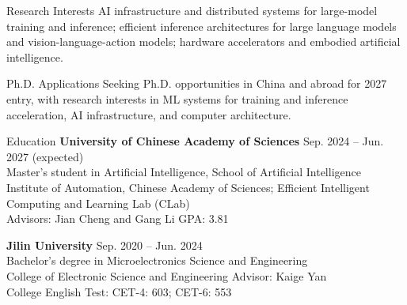 \documentclass{resume}
\begin{document}
\fontsize{10}{12}\selectfont
\begin{rSection}{Research Interests}
AI infrastructure and distributed systems for large-model training and inference; efficient inference architectures for large language models and vision-language-action models; hardware accelerators and embodied artificial intelligence.
\end{rSection}

\begin{rSection}{Ph.D. Applications}
Seeking Ph.D. opportunities in China and abroad for 2027 entry, with research interests in ML systems for training and inference acceleration, AI infrastructure, and computer architecture.
\end{rSection}

\begin{rSection}{Education}
\textbf{University of Chinese Academy of Sciences} \hfill Sep. 2024 -- Jun. 2027 (expected)\\
Master's student in Artificial Intelligence, School of Artificial Intelligence\\
Institute of Automation, Chinese Academy of Sciences; Efficient Intelligent Computing and Learning Lab (CLab)\\
Advisors: Jian Cheng and Gang Li \hfill GPA: 3.81

\textbf{Jilin University} \hfill Sep. 2020 -- Jun. 2024\\
Bachelor's degree in Microelectronics Science and Engineering\\
College of Electronic Science and Engineering \hfill Advisor: Kaige Yan\\
College English Test: CET-4: 603; CET-6: 553
\end{rSection}
\end{document}

